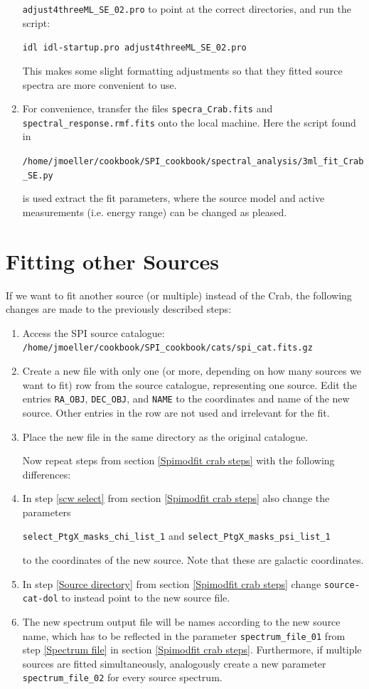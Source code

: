 \documentclass{report}
\begin{document}
\begin{enumerate}
    \verb|adjust4threeML_SE_02.pro| to point at the correct directories, and run the script:
    
    \verb|idl idl-startup.pro adjust4threeML_SE_02.pro|

    This makes some slight formatting adjustments so that they fitted source spectra are more convenient to use. 

    \item For convenience, transfer the files \verb|specra_Crab.fits| and \verb|spectral_response.rmf.fits| onto the local machine. Here the script found in
    
    \verb|/home/jmoeller/cookbook/SPI_cookbook/spectral_analysis/3ml_fit_Crab_SE.py|
    
    is used extract the fit parameters, where the source model and active measurements (i.e. energy range) can be changed as pleased.
\end{enumerate}


\section{Fitting other Sources}
If we want to fit another source (or multiple) instead of the Crab, the following changes are made to the previously described steps:

\begin{enumerate}
    \item Access the SPI source catalogue: \verb|/home/jmoeller/cookbook/SPI_cookbook/cats/spi_cat.fits.gz|
    \item Create a new file with only one (or more, depending on how many sources we want to fit) row from the source catalogue, representing one source. Edit the entries \verb|RA_OBJ|, \verb|DEC_OBJ|, and \verb|NAME| to the coordinates and name of the new source. Other entries in the row are not used and irrelevant for the fit.
    \item Place the new file in the same directory as the original catalogue.
    
    Now repeat steps from section \ref{Spimodfit crab steps} with the following differences:
    \item In step \ref{scw select} from section \ref{Spimodfit crab steps} also change the parameters 
    
    \verb|select_PtgX_masks_chi_list_1| and \verb|select_PtgX_masks_psi_list_1| 
    
    to the coordinates of the new source. Note that these are galactic coordinates.
    \item In step \ref{Source directory} from section \ref{Spimodfit crab steps} change \verb|source-cat-dol| to instead point to the new source file.
    \item The new spectrum output file will be names according to the new source name, which has to be reflected in the parameter \verb|spectrum_file_01| from step \ref{Spectrum file} in section \ref{Spimodfit crab steps}. Furthermore, if multiple sources are fitted simultaneously, analogously create a new parameter \verb|spectrum_file_02| for every source spectrum.
\end{enumerate}
\end{document}
